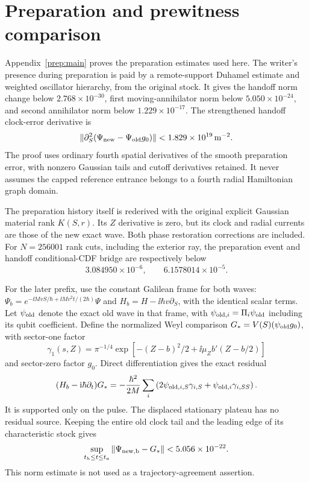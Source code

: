 \documentclass[11pt]{article}
\theoremstyle{definition}\newtheorem{definition}[theorem]{Definition}
\theoremstyle{remark}\newtheorem{remark}[theorem]{Remark}
\begin{document}
\section{Preparation and prewitness comparison}

Appendix~\ref{prep:main} proves the preparation estimates used here.
The writer's presence during preparation is paid by a remote-support
Duhamel estimate and weighted oscillator hierarchy, from the original
stock. It gives the handoff norm change below $2.768\times10^{-30}$,
first moving-annihilator norm below $5.050\times10^{-24}$, and second
annihilator norm below $1.229\times10^{-17}$. The strengthened handoff
clock-error derivative is
\[
 \|\partial_S^2(\Psi_{\rm new}-\Psi_{\rm old}g_0)\|
       <1.829\times10^{19}\,\mathrm m^{-2}.
\]
The proof uses ordinary fourth spatial derivatives of the smooth
preparation error, with nonzero Gaussian tails and cutoff derivatives
retained. It never assumes the capped reference entrance belongs to a
fourth radial Hamiltonian graph domain.

The preparation history itself is rederived with the original explicit
Gaussian material rank $K(S,r)$. Its $Z$ derivative is zero, but its
clock and radial currents are those of the new exact wave. Both phase
restoration corrections are included. For $N=256001$ rank cuts, including
the exterior ray, the preparation event and handoff conditional-CDF
bridge are respectively below
\[
 3.084950\times10^{-6},\qquad 6.1578014\times10^{-5}.
\]

For the later prefix, use the constant Galilean frame for both waves:
$\Psi_b=e^{-\ii MvS/\hbar+\ii Mv^2t/(2\hbar)}\Psi$ and
$H_b=H-\ii\hbar v\partial_S$, with the identical scalar terms.
Let $\psi_{\rm old}$ denote the exact old wave in that frame, with
$\psi_{{\rm old},i}=\Pi_i\psi_{\rm old}$ including its qubit coefficient.
Define the normalized Weyl
comparison $G_*=V(S)(\psi_{\rm old}g_0)$, with sector-one factor
\[
 \gamma_1(s,Z)=\pi^{-1/4}
 \exp\!\left[-(Z-b)^2/2+\ii\mu_Z b'(Z-b/2)\right]
\]
and sector-zero factor $g_0$. Direct differentiation gives the exact
residual
\[
 (H_b-\mathrm i\hbar\partial_t)G_*
 =-\frac{\hbar^2}{2M}\sum_i
       \left(2\psi_{{\rm old},i,S}\gamma_{i,S}
                       +\psi_{{\rm old},i}\gamma_{i,SS}\right).
\]
It is supported only on the pulse. The displaced stationary plateau
has no residual source. Keeping the entire old clock tail and the
leading edge of its characteristic stock gives
\[
\sup_{t_h\leq t\leq t_a}\|\Psi_{
 \rm new,b}-G_*\|<5.056\times10^{-22}.
\]
This norm estimate is not used as a trajectory-agreement assertion.
\end{document}
